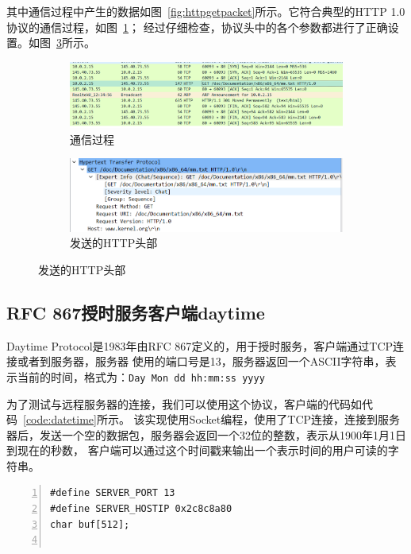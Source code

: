 \documentclass[a4paper,twoside]{ctexrep}
\begin{document}
\begin{spacing}{1.2}
其中通信过程中产生的数据如图~\ref{fig:httpgetpacket}所示。它符合典型的HTTP
1.0协议的通信过程，如图~\ref{fig:httpgetprocess}；
经过仔细检查，协议头中的各个参数都进行了正确设置。如图~\ref{fig:httpgetheader}所示。
\begin{figure}[htb]
	\centering
	\caption{httpget命令产生的数据包}
	\label{fig:httpgetpacket}
	\begin{subfigure}{0.4\textwidth}
		\centering
		\includegraphics[width=\textwidth]{httpgetpack.png}
		\caption{通信过程}
		\label{fig:httpgetprocess}
	\end{subfigure}
	\begin{subfigure}{0.4\textwidth}
		\centering
		\includegraphics[width=\textwidth]{httpheader.png}
		\caption{发送的HTTP头部}
		\label{fig:httpgetheader}
	\end{subfigure}
\end{figure}

\subsection{RFC 867授时服务客户端daytime}

Daytime Protocol是1983年由RFC 867\cite{postel1983rfc0867}定义的，用于授时服务，客户端通过TCP连接或者到服务器，服务器
使用的端口号是13，服务器返回一个ASCII字符串，表示当前的时间，格式为：\texttt{Day Mon dd hh:mm:ss yyyy}

为了测试与远程服务器的连接，我们可以使用这个协议，客户端的代码如代码~\ref{code:datetime}所示。
该实现使用Socket编程，使用了TCP连接，连接到服务器后，发送一个空的数据包，服务器会返回一个32位的整数，表示从1900年1月1日到现在的秒数，
客户端可以通过这个时间戳来输出一个表示时间的用户可读的字符串。

\begin{lstlisting}[numbers=left,style=CppStyle,caption={daytime客户端},label={code:datetime}]
#define SERVER_PORT 13
#define SERVER_HOSTIP 0x2c8c8a80
char buf[512];


\end{lstlisting}
\end{spacing}
\end{document}
